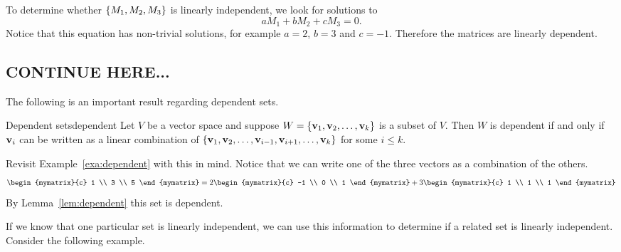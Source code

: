 \begin{solution}
  To determine whether $\left\{M_1,M_2,M_3\right\}$ is linearly independent, we
  look for solutions to
  \begin{equation*}
    aM_1 + bM_2 + cM_3 = 0.
  \end{equation*}
  Notice that this equation has non-trivial solutions, for example
  $a=2$, $b=3$ and $c=-1$. Therefore the matrices are linearly
  dependent.
\end{solution}

\subsection*{CONTINUE HERE...}

The following is an important result regarding dependent sets.

\begin{lemma}{Dependent sets}{dependent}
  Let $V$ be a vector space and suppose
  $W = \left\{\mbox{\bf v}_1, \mbox{\bf v}_2,\ldots, \mbox{\bf v}_k \right\}$ is a subset
  of $V$. Then $W$ is dependent if and only if $\mbox{\bf v}_i$ can be
  written as a linear combination of
  $\left\{\mbox{\bf v}_1, \mbox{\bf v}_2,\ldots, \mbox{\bf v}_{i-1},
    \mbox{\bf v}_{i+1},\ldots, \mbox{\bf v}_k \right\}$ for some $i \leq k$.
\end{lemma}

Revisit Example~\ref{exa:dependent} with this in mind. Notice that we
can write one of the three vectors as a combination of the others.
\begin{equation*}
  \begin{mymatrix}{c} 1 \\ 3 \\ 5 \end{mymatrix}
  =
  2\begin{mymatrix}{c} -1 \\ 0 \\ 1 \end{mymatrix}
  +3\begin{mymatrix}{c} 1 \\ 1 \\ 1 \end{mymatrix}
\end{equation*}
By Lemma~\ref{lem:dependent} this set is dependent.

If we know that one particular set is linearly independent, we can use
this information to determine if a related set is linearly
independent. Consider the following example.

